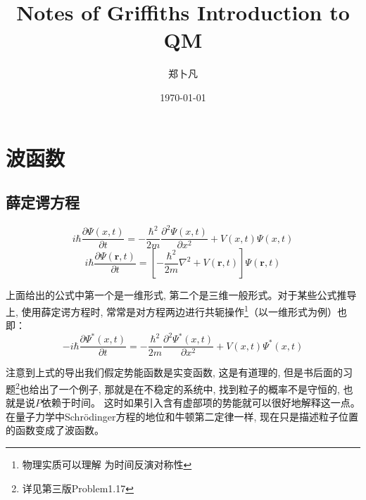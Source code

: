 \documentclass[a4paper,zihao=-4,linespread=1]{ctexrep}
\title{Notes of Griffiths Introduction to QM}   %
\author{郑卜凡}                     %
\date{\today}                             %
\newenvironment{lequation}{\large\begin{equation}}{\end{equation}}
\begin{document}
    \maketitle              %
    \tableofcontents        %
    \setcounter{page}{0}
    \thispagestyle{empty}
    \chapter{波函数}
    \section{薛定谔方程}
    \begin{lequation}\label{S-1-D}
        \boxed{
            i\hbar\frac{\partial \Psi\left(x,t\right)}{\partial t}=-\frac{\hbar^{2}}{2m}\frac{\partial^{2}\Psi\left(x,t\right)}{\partial x^{2}}+
            V\left(x,t\right)\Psi\left(x,t\right)
        }
    \end{lequation}
    \begin{lequation}\label{S-3-D}
        \boxed{
            i\hbar\frac{\partial \Psi\left(\bm{r},t\right)}{\partial t}=\left[-\frac{\hbar^{2}}{2m}\nabla^{2}+
            V\left(\bm{r},t\right)\right]\Psi\left(\bm{r},t\right) 
        }
    \end{lequation}


    上面给出的公式中第一个是一维形式, 第二个是三维一般形式。对于某些公式推导上, 使用薛定谔方程时, 常常是对方程两边进行共轭操作\footnote[1]{物理实质可以理解
    为时间反演对称性}（以一维形式为例）也即：
    \begin{lequation}
        -i\hbar\frac{\partial \Psi^{*}\left(x,t\right)}{\partial t}=-\frac{\hbar^{2}}{2m}\frac{\partial^{2}\Psi^{*}\left(x,t\right)}{\partial x^{2}}+
        V\left(x,t\right)\Psi^{*}\left(x,t\right)
    \end{lequation}


    注意到上式的导出我们假定势能函数是实变函数, 这是有道理的, 但是书后面的习题\footnote[2]{详见第三版Problem1.17}也给出了一个例子, 那就是在不稳定的系统中, 找到粒子的概率不是守恒的, 也就是说$P$依赖于时间。
    这时如果引入含有虚部项的势能就可以很好地解释这一点。在量子力学中Schr{\"o}dinger方程的地位和牛顿第二定律一样, 现在只是描述粒子位置的函数变成了波函数。
\end{document}
